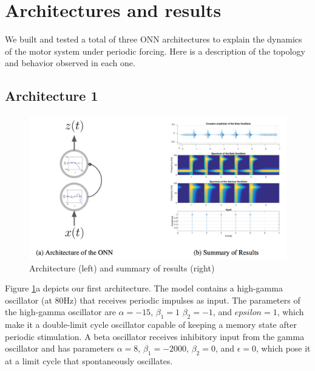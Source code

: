 \documentclass{article}
\begin{document}
\section{Architectures and results}

We built and tested a total of three ONN architectures to explain the dynamics of the motor system under periodic forcing. Here is a description of the topology and behavior observed in each one. 

\subsection{Architecture 1}

\begin{figure}[h]
  \centering
  \includegraphics[scale=0.5]{arch1.png}
  \caption{Architecture (left) and summary of results (right)}
  \label{fig:arch1}
\end{figure}

Figure \ref{fig:arch1}a depicts our first architecture. The model contains a high-gamma oscillator (at 80Hz) that receives periodic impulses as input. The parameters of the high-gamma oscillator are $\alpha = -15$, $\beta_1 = 1$ $\beta_2 = -1$, and $epsilon = 1$, which make it a double-limit cycle oscillator capable of keeping a memory state after periodic stimulation. A beta oscillator receives inhibitory input from the gamma oscillator and has parameters $\alpha = 8$, $\beta_1 = -2000$, $\beta_2 = 0$, and $\epsilon = 0$, which pose it at a limit cycle that spontaneously oscillates. 
\end{document}
